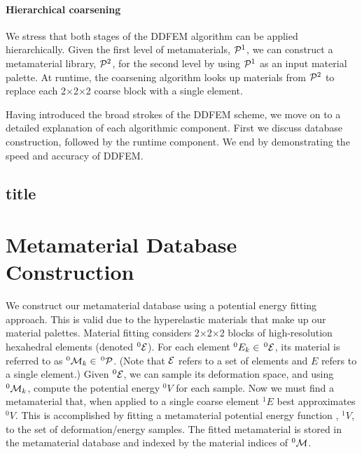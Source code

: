 \paragraph{Hierarchical coarsening}
We stress that both stages of the DDFEM algorithm can be applied hierarchically. Given the first level of metamaterials, $\mathcal{P}^1$, we can construct a metamaterial library, $\mathcal{P}^2$, for the second level by using $\mathcal{P}^1$ as an input material palette. At runtime, the coarsening algorithm looks up materials from $\mathcal{P}^2$ to replace each 2$\times$2$\times$2 coarse block with a single element.

Having introduced the broad strokes of the DDFEM scheme, we move on to a detailed explanation of each algorithmic component. First we discuss database construction, followed by the runtime component. We end by demonstrating the speed and accuracy of DDFEM.
\subsection{title}
\section{Metamaterial Database Construction}
\label{sec:database}
We construct our metamaterial database using a potential energy fitting approach. This is valid due to the hyperelastic materials that make up our material palettes. Material fitting considers 2$\times$2$\times$2 blocks of high-resolution hexahedral elements (denoted $^0\mathcal{E}$). For each element $^0E_k\in \, ^0\mathcal{E}$, its material is referred to as $^0\mathcal{M}_k\in \, ^0\mathcal{P}$. (Note that $\mathcal{E}$ refers to a set of elements and $E$ refers to a single element.) Given $^0\mathcal{E}$, we can sample its deformation space, and using $^0\mathcal{M}_k$, compute the potential energy $^0V$ for each sample.  Now we must find a metamaterial that, when applied to a single coarse element $^1\mathit{E}$ best approximates $^0V$.  This is accomplished by fitting a metamaterial potential energy function , $^1V$, to the set of deformation/energy samples. The fitted metamaterial is stored in the metamaterial database and indexed by the material indices of $^0\mathcal{M}$.

